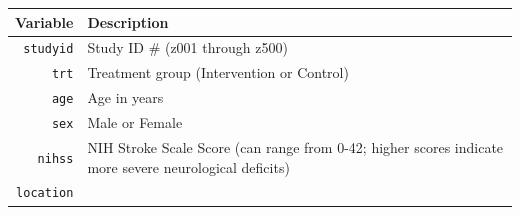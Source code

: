 \documentclass[]{book}
\theoremstyle{definition}
\theoremstyle{definition}
\theoremstyle{definition}
\theoremstyle{remark}
\begin{document}
\begin{longtable}[]{@{}rl@{}}
\toprule
\begin{minipage}[b]{0.16\columnwidth}\raggedleft\strut
Variable\strut
\end{minipage} & \begin{minipage}[b]{0.55\columnwidth}\raggedright\strut
Description\strut
\end{minipage}\tabularnewline
\midrule
\endhead
\begin{minipage}[t]{0.16\columnwidth}\raggedleft\strut
\texttt{studyid}\strut
\end{minipage} & \begin{minipage}[t]{0.55\columnwidth}\raggedright\strut
Study ID \# (z001 through z500)\strut
\end{minipage}\tabularnewline
\begin{minipage}[t]{0.16\columnwidth}\raggedleft\strut
\texttt{trt}\strut
\end{minipage} & \begin{minipage}[t]{0.55\columnwidth}\raggedright\strut
Treatment group (Intervention or Control)\strut
\end{minipage}\tabularnewline
\begin{minipage}[t]{0.16\columnwidth}\raggedleft\strut
\texttt{age}\strut
\end{minipage} & \begin{minipage}[t]{0.55\columnwidth}\raggedright\strut
Age in years\strut
\end{minipage}\tabularnewline
\begin{minipage}[t]{0.16\columnwidth}\raggedleft\strut
\texttt{sex}\strut
\end{minipage} & \begin{minipage}[t]{0.55\columnwidth}\raggedright\strut
Male or Female\strut
\end{minipage}\tabularnewline
\begin{minipage}[t]{0.16\columnwidth}\raggedleft\strut
\texttt{nihss}\strut
\end{minipage} & \begin{minipage}[t]{0.55\columnwidth}\raggedright\strut
NIH Stroke Scale Score (can range from 0-42; higher scores indicate more
severe neurological deficits)\strut
\end{minipage}\tabularnewline
\begin{minipage}[t]{0.16\columnwidth}\raggedleft\strut
\texttt{location}\strut
\end{minipage} & \begin{minipage}[t]{0.55\columnwidth}\raggedright\strut

\end{minipage}
\end{longtable}
\end{document}
